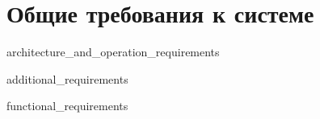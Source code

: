 \section{Общие требования к системе}


{architecture_and_operation_requirements}


{additional_requirements}


{functional_requirements}
